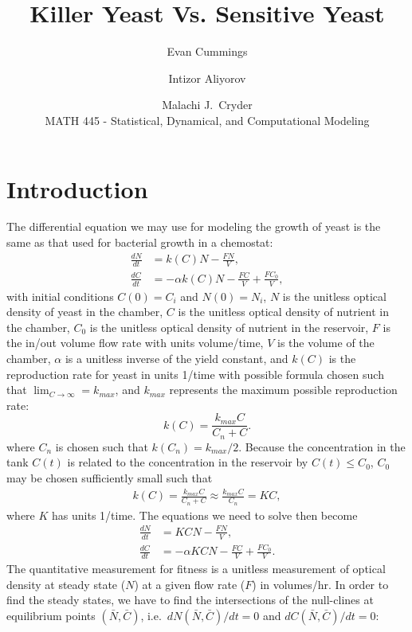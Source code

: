 


\small

\title{Killer Yeast Vs. Sensitive Yeast}
\author{Evan Cummings \and Intizor Aliyorov \and Malachi J.\ Cryder\\
MATH 445 - Statistical, Dynamical, and Computational Modeling}

\maketitle

\section*{Introduction}
The differential equation we may use for modeling the growth of yeast is the same as that used for bacterial growth in a chemostat:
\begin{align*}
  \frac{dN}{dt} &= k(C) N - \frac{FN}{V}, \\
  \frac{dC}{dt} &= -\alpha k(C) N - \frac{FC}{V} + \frac{FC_0}{V},
\end{align*}
with initial conditions $C(0) = C_i$ and $N(0) = N_i$, $N$ is the unitless optical density of yeast in the chamber, $C$ is the unitless optical density of nutrient in the chamber, $C_0$ is the unitless optical density of nutrient in the reservoir, $F$ is the in/out volume flow rate with units volume/time, $V$ is the volume of the chamber, $\alpha$ is a unitless inverse of the yield constant, and $k(C)$ is the reproduction rate for yeast in units 1/time with possible formula chosen such that $\lim_{C \rightarrow \infty} = k_{max}$, and $k_{max}$ represents the maximum possible reproduction rate:
$$k(C) = \frac{k_{max} C}{C_n + C}.$$
where $C_n$ is chosen such that $k(C_n) = k_{max} / 2$.  Because the concentration in the tank $C(t)$ is related to the concentration in the reservoir by $C(t) \leq C_0$, $C_0$ may be chosen sufficiently small such that 
\begin{align*}
  k(C) = \frac{k_{max} C}{C_n + C} \approx \frac{k_{max} C}{C_n} = KC,
\end{align*}
where $K$ has units 1/time. The equations we need to solve then become 
\begin{align}
  \frac{dN}{dt} &= KCN - \frac{FN}{V}, \\
  \frac{dC}{dt} &= -\alpha KCN - \frac{FC}{V} + \frac{FC_0}{V}.
\end{align}
The quantitative measurement for fitness is a unitless measurement of optical density at steady state ($N$) at a given flow rate ($F$) in volumes/hr.  In order to find the steady states, we have to find the intersections of the null-clines at equilibrium points $(\bar{N}, \bar{C})$, i.e.\ $dN(\bar{N},\bar{C})/dt = 0$ and $dC(\bar{N},\bar{C})/dt = 0$:
